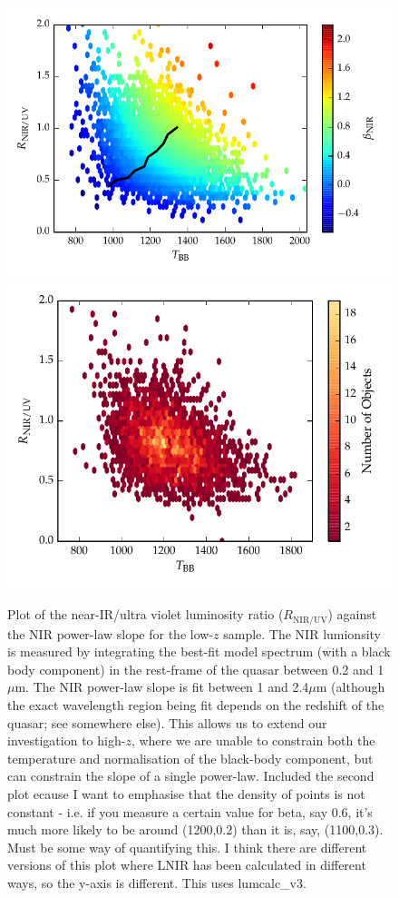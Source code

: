 \begin{figure}
\centering
  \includegraphics[width=\columnwidth]{figures/chapter06/ratio_tbb_beta.pdf}
  \includegraphics[width=\columnwidth]{figures/chapter06/ratio_tbb_beta_density.pdf}
\caption{ Plot of the near-IR/ultra violet luminosity ratio ($R_{\mathrm{NIR}/\mathrm{UV}}$) against the NIR power-law slope for the low-$z$ sample. The NIR lumionsity is measured by integrating the best-fit model spectrum (with a black body component) in the rest-frame of the quasar between 0.2 and 1 $\mu$m. The NIR power-law slope is fit between 1 and 2.4$\mu$m (although the exact wavelength region being fit depends on the redshift of the quasar; see somewhere else). This allows us to extend our investigation to high-$z$, where we are unable to constrain both the temperature and normalisation of the black-body component, but can constrain the slope of a single power-law. Included the second plot ecause I want to emphasise that the density of points is not constant - i.e. if you measure a certain value for beta, say 0.6, it's much more likely to be around (1200,0.2) than it is, say, (1100,0.3). Must be some way of quantifying this. I think there are different versions of this plot where LNIR has been calculated in different ways, so the y-axis is different. This uses lumcalc\_v3. }
  \label{fig:fig}
\end{figure}


